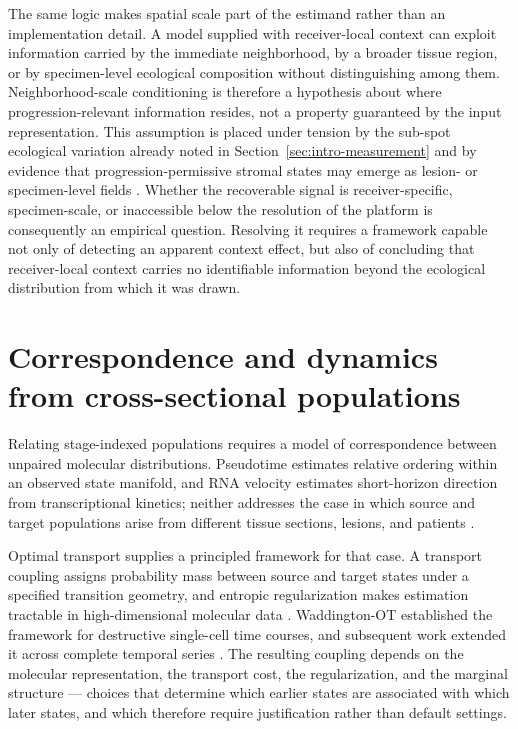 The same logic makes spatial scale part of the estimand rather than an
implementation detail. A model supplied with receiver-local context can
exploit information carried by the immediate neighborhood, by a broader
tissue region, or by specimen-level ecological composition without
distinguishing among them. Neighborhood-scale conditioning is therefore a
hypothesis about where progression-relevant information resides, not a
property guaranteed by the input representation. This assumption is placed
under tension by the sub-spot ecological variation already noted in
Section~\ref{sec:intro-measurement} and by evidence that
progression-permissive stromal states may emerge as lesion- or
specimen-level fields \autocite{Elhossiny2026-pq}. Whether the recoverable
signal is receiver-specific, specimen-scale, or inaccessible below the
resolution of the platform is consequently an empirical question. Resolving
it requires a framework capable not only of detecting an apparent context
effect, but also of concluding that receiver-local context carries no
identifiable information beyond the ecological distribution from which it
was drawn.

\section{Correspondence and dynamics from cross-sectional populations}
\label{sec:intro-dynamics}

Relating stage-indexed populations requires a model of correspondence between
unpaired molecular distributions. Pseudotime estimates relative ordering
within an observed state manifold, and RNA velocity estimates short-horizon
direction from transcriptional kinetics; neither addresses the case in which
source and target populations arise from different tissue sections, lesions,
and patients \autocite{Richter2026-ib,Weinreb2018-jq}.

Optimal transport supplies a principled framework for that case. A transport
coupling assigns probability mass between source and target states under a
specified transition geometry, and entropic regularization makes estimation
tractable in high-dimensional molecular data \autocite{Cuturi2013-li}.
Waddington-OT established the framework for destructive single-cell time
courses, and subsequent work extended it across complete temporal series
\autocite{Schiebinger2019-lm,Lavenant2023-qv}. The resulting coupling depends
on the molecular representation, the transport cost, the regularization, and
the marginal structure --- choices that determine which earlier states are
associated with which later states, and which therefore require
justification rather than default settings.

